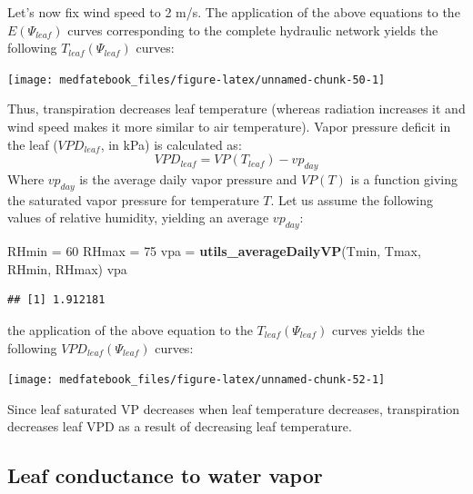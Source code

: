 \documentclass[]{book}
\newenvironment{Shaded}{\begin{snugshade}}{\end{snugshade}}
\newcommand{\KeywordTok}[1]{\textcolor[rgb]{0.13,0.29,0.53}{\textbf{#1}}}
\newcommand{\DecValTok}[1]{\textcolor[rgb]{0.00,0.00,0.81}{#1}}
\newcommand{\StringTok}[1]{\textcolor[rgb]{0.31,0.60,0.02}{#1}}
\newcommand{\NormalTok}[1]{#1}
\begin{document}
Let's now fix wind speed to 2 m/s. The application of the above equations to the \(E(\Psi_{leaf})\) curves corresponding to the complete hydraulic network yields the following \(T_{leaf}(\Psi_{leaf})\) curves:

\begin{center}\texttt{[image: medfatebook\_files/figure-latex/unnamed-chunk-50-1]} \end{center}

Thus, transpiration decreases leaf temperature (whereas radiation increases it and wind speed makes it more similar to air temperature). Vapor pressure deficit in the leaf (\(VPD_{leaf}\), in kPa) is calculated as:
\begin{equation}
VPD_{leaf} = VP(T_{leaf})-vp_{day}
\end{equation}
Where \(vp_{day}\) is the average daily vapor pressure and \(VP(T)\) is a function giving the saturated vapor pressure for temperature \(T\). Let us assume the following values of relative humidity, yielding an average \(vp_{day}\):

\begin{Shaded}
\begin{Highlighting}[]
\NormalTok{RHmin =}\StringTok{ }\DecValTok{60}
\NormalTok{RHmax =}\StringTok{ }\DecValTok{75}
\NormalTok{vpa =}\StringTok{ }\KeywordTok{utils_averageDailyVP}\NormalTok{(Tmin, Tmax, RHmin, RHmax)}
\NormalTok{vpa}
\end{Highlighting}
\end{Shaded}

\begin{verbatim}
## [1] 1.912181
\end{verbatim}

the application of the above equation to the \(T_{leaf}(\Psi_{leaf})\) curves yields the following \(VPD_{leaf}(\Psi_{leaf})\) curves:

\begin{center}\texttt{[image: medfatebook\_files/figure-latex/unnamed-chunk-52-1]} \end{center}

Since leaf saturated VP decreases when leaf temperature decreases, transpiration decreases leaf VPD as a result of decreasing leaf temperature.

\hypertarget{leaf-conductance-to-water-vapor}{%
\subsection{Leaf conductance to water vapor}\label{leaf-conductance-to-water-vapor}}
\end{document}
